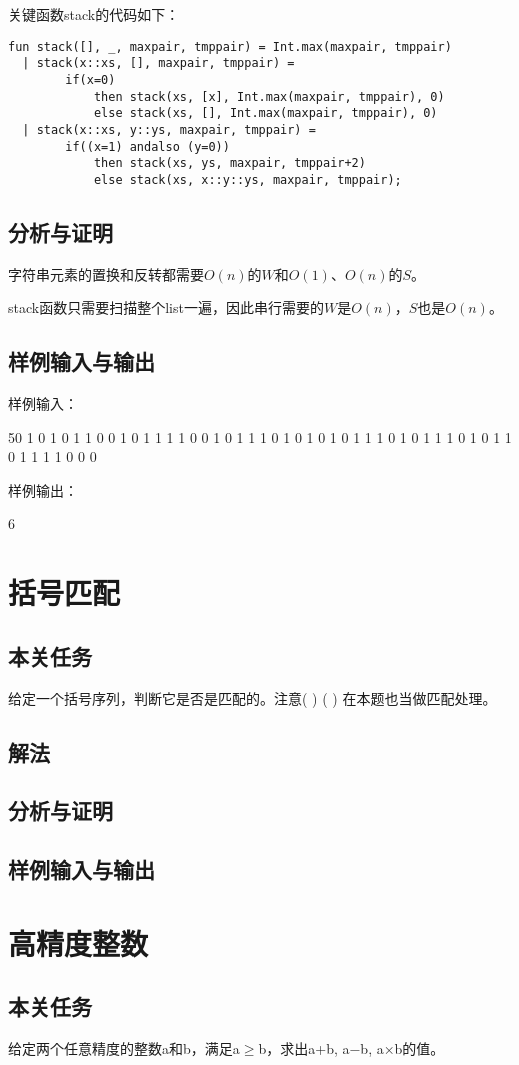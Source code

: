 \documentclass[UTF8,a4paperdui, %
]{ctexart}
\begin{document}
关键函数stack的代码如下：
\begin{lstlisting}
fun stack([], _, maxpair, tmppair) = Int.max(maxpair, tmppair)
  | stack(x::xs, [], maxpair, tmppair) = 
        if(x=0) 
            then stack(xs, [x], Int.max(maxpair, tmppair), 0)
            else stack(xs, [], Int.max(maxpair, tmppair), 0)
  | stack(x::xs, y::ys, maxpair, tmppair) = 
        if((x=1) andalso (y=0)) 
            then stack(xs, ys, maxpair, tmppair+2)
            else stack(xs, x::y::ys, maxpair, tmppair);
\end{lstlisting}
\subsection{分析与证明}
字符串元素的置换和反转都需要$O(n)$的$W$和$O(1)$、$O(n)$的$S$。

stack函数只需要扫描整个list一遍，因此串行需要的$W$是$O(n)$，$S$也是$O(n)$。
\subsection{样例输入与输出}
样例输入：

50 1 0 1 0 1 1 0 0 1 0 1 1 1 1 0 0 1 0 1 1 1 0 1 0 1 0 1 0 1 1 1 0 1 0 1 1 1 0 1 0 1 1 0 1 1 1 1 0 0 0

样例输出：

6
\section{括号匹配}
\subsection{本关任务}
给定一个括号序列，判断它是否是匹配的。注意( ) ( ) 在本题也当做匹配处理。
\subsection{解法}


\subsection{分析与证明}
\subsection{样例输入与输出}
\section{高精度整数}
\subsection{本关任务}
给定两个任意精度的整数a和b，满足a$\geq$b，求出a+b, a−b, a×b的值。
\end{document}
